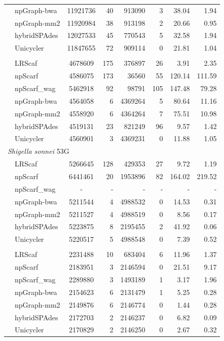 \documentclass[10pt,letterpaper]{article}
\begin{document}
\begin{longtable}[!hpt]{llcrrrrr}
& npGraph-bwa & 11921736  &  40  &  913090  &  3 &  38.04 &  1.94\\*
& npGraph-mm2 & 11920984  &  38  &  913198  &  2 &  20.66 &  0.95\\*
& hybridSPAdes &  12027533 &  45  &  770543  &  5  & 32.58  & 1.94\\*
& Unicycler &  11847655 & 72  & 909114  &  0 & 21.81  &  1.04\\
\hline
\rowcolor{Gray}
\multicolumn{8}{l}{\emph{Shigella dysenteriae}  Sd197} \\* %
\nobreakmidrule
\rowcolor{Gray}
& LRScaf & 4678609 & 175 & 376897 & 26 & 3.91 & 2.35\\*
\rowcolor{Gray}
& npScarf &  4586075 &  173  & 36560   &  55  & 120.14  & 111.59\\*
\rowcolor{Gray}
& npScarf\_wag & 5462918  &  92  &  98791  &  105  &  147.48 & 79.28\\*
\rowcolor{Gray}
& npGraph-bwa & 4564058  &  6  &  4369264  &  5  & 80.64  & 11.16\\*
\rowcolor{Gray}
& npGraph-mm2 & 4558920  &  6  &  4364264  &  7  & 75.51  & 10.98\\*
\rowcolor{Gray}
& hybridSPAdes &  4519131 & 23   &  821249  & 96   & 9.57  &  1.42\\*
\rowcolor{Gray}
& Unicycler & 4560901  & 3   &  4369231  &  0  & 11.88  & 1.05 \\
\hline
\multicolumn{8}{l}{\emph{Shigella sonnei} 53G} \\* %
\nobreakmidrule
& LRScaf & 5266645 & 128 & 429353 & 27 & 9.72 & 1.19\\*
& npScarf &  6441461 &  20  &  1953896  &  82  & 164.02  &  219.52\\*
& npScarf\_wag & -  &  -  &  -  &  -  & -  &  -\\*
& npGraph-bwa & 5211544  &   4 &  4988532  & 0  & 14.53  &  0.31\\*
& npGraph-mm2 & 5211527  &  4  &   4988519 & 0  &  8.56 &  0.17\\*
& hybridSPAdes & 5223875  &  8  &  2195455  &  2  & 41.92  & 0.06\\*
& Unicycler &  5220517 &  5 &  4988548 & 0  & 7.39  &  0.52\\
\hline
\rowcolor{Gray}
\multicolumn{8}{l}{\emph{Streptococcus suis} BM407} \\* %
\nobreakmidrule
\rowcolor{Gray}
& LRScaf & 2231488 & 10 & 683404 & 6 & 11.96 & 1.37\\*
\rowcolor{Gray}
& npScarf &  2183951 & 3   &  2146594  &  0  & 21.51  & 9.17\\*
\rowcolor{Gray}
& npScarf\_wag & 2289880  &  3  &  1493189  &  1  & 3.17  & 1.96\\*
\rowcolor{Gray}
& npGraph-bwa & 2154623  &  6  &  2131479  &  1  & 5.25  & 0.28\\*
\rowcolor{Gray}
& npGraph-mm2 & 2149876  &  6  &  2146774  &  0  & 1.44  & 0.28\\*
\rowcolor{Gray}
& hybridSPAdes & 2172703  &  2  &  2146237  &  0  & 6.82  &  0.09\\*
\rowcolor{Gray}
& Unicycler &  2170829 &   2 &  2146250  &  0  &  2.67 & 0.32 \\
\hline
\end{longtable}
\end{document}
